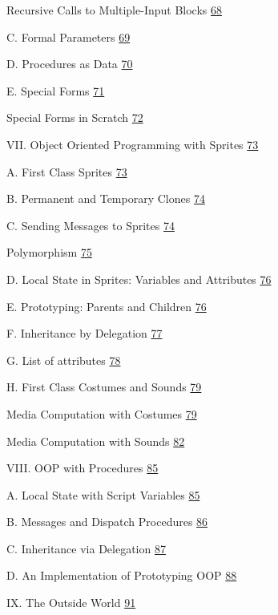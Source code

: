 Recursive Calls to Multiple-Input Blocks
\hyperref[recursive-calls-to-multiple-input-blocks]{68}

C. Formal Parameters \hyperref[formal-parameters]{69}

D. Procedures as Data \hyperref[procedures-as-data-1]{70}

E. Special Forms \hyperref[special-forms]{71}

Special Forms in Scratch \hyperref[special-forms-in-scratch]{72}

VII. Object Oriented Programming with Sprites
\hyperref[object-oriented-programming-with-sprites]{73}

A. First Class Sprites \hyperref[first-class-sprites]{73}

B. Permanent and Temporary Clones
\hyperref[permanent-and-temporary-clones]{74}

C. Sending Messages to Sprites
\hyperref[sending-messages-to-sprites]{74}

Polymorphism \hyperref[polymorphism]{75}

D. Local State in Sprites: Variables and Attributes
\hyperref[local-state-in-sprites-variables-and-attributes]{76}

E. Prototyping: Parents and Children
\hyperref[prototyping-parents-and-children]{76}

F. Inheritance by Delegation \hyperref[inheritance-by-delegation]{77}

G. List of attributes \hyperref[attrib.pnglist-of-attributes]{78}

H. First Class Costumes and Sounds
\hyperref[first-class-costumes-and-sounds]{79}

Media Computation with Costumes
\hyperref[media-computation-with-costumes]{79}

Media Computation with Sounds
\hyperref[media-computation-with-sounds]{82}

VIII. OOP with Procedures \hyperref[oop-with-procedures]{85}

A. Local State with Script Variables
\hyperref[local-state-with-script-variables]{85}

B. Messages and Dispatch Procedures
\hyperref[messages-and-dispatch-procedures]{86}

C. Inheritance via Delegation \hyperref[inheritance-via-delegation]{87}

D. An Implementation of Prototyping OOP
\hyperref[an-implementation-of-prototyping-oop]{88}

IX. The Outside World \hyperref[the-outside-world]{91}

